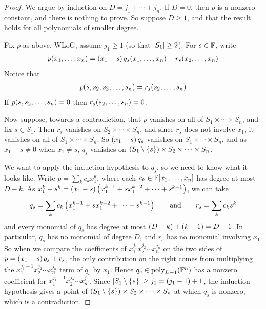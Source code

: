 \begin{proof}
    We argue by induction on $D = j_1 + \cdots + j_n$. If $D = 0$, then $p$ is a nonzero constant, and there is nothing to prove. So suppose $D \geq 1$, and that the result holds for all polynomials of smaller degree.

    Fix $p$ as above. WLoG, assume $j_1 \geq 1$ (so that $\left\lvert S_1 \right\rvert \geq 2$). For $s \in \mathbb{F}$, write
    \begin{align*}
        p\!\left( x_1, \ldots, x_n \right) = \left( x_1 - s \right) q_s\!\left( x_1, \ldots, x_n \right) + r_s\!\left( x_2, \ldots, x_n \right)
    \end{align*}
    Notice that
    \begin{align*}
        p\!\left( s, s_2, s_3, \ldots, s_n \right) = r_s\!\left( s_2, \ldots, s_n \right)
    \end{align*}
    If $p\!\left( s, s_2, \ldots, s_n \right) = 0$ then $r_s\!\left( s_2, \ldots, s_n \right) = 0$.

    Now suppose, towards a contradiction, that $p$ vanishes on all of $S_1 \times \cdots \times S_n$, and fix $s \in S_1$. Then $r_s$ vanishes on $S_2 \times \cdots \times S_n$, and since $r_s$ does not involve $x_1$, it vanishes on all of $S_1 \times \cdots \times S_n$. So $\left( x_1 - s \right) q_s$ vanishes on $S_1 \times \cdots \times S_n$, and as $x_1 - s \neq 0$ when $x_1 \neq s$, $q_s$ vanishes on $\left( S_1 \setminus \left\{ s \right\} \right) \times S_2 \times \cdots \times S_n$.

    We want to apply the induction hypothesis to $q_s$, so we need to know what it looks like. Write $p = \sum_{k} c_k x_1^k$, where each $c_k \in \mathbb{F}\!\left[ x_2, \ldots, x_n \right]$ has degree at most $D - k$. As $x_1^k - s^k = \left( x_1 - s \right)\left( x_1^{k-1} + s x_1^{k-2} + \cdots + s^{k-1} \right)$, we can take
    \begin{align*}
        q_s = \sum_{k} c_k \left( x_1^{k-1} + s x_1^{k-2} + \cdots + s^{k-1} \right) \qquad \text{and} \qquad r_s = \sum_k c_k s^k
    \end{align*}
    and every monomial of $q_s$ has degree at most $\left( D - k \right) + \left( k - 1 \right) = D - 1$. In particular, $q_s$ has no monomial of degree $D$, and $r_s$ has no monomial involving $x_1$. So when we compare the coefficients of $x_1^{j_1} x_2^{j_2} \cdots x_n^{j_n}$ on the two sides of $p = \left( x_1 - s \right) q_s + r_s$, the only contribution on the right comes from multiplying the $x_1^{j_1 - 1} x_2^{j_2} \cdots x_n^{j_n}$ term of $q_s$ by $x_1$. Hence $q_s \in \operatorname{poly}_{D - 1}\!\left( \mathbb{F}^n \right)$ has a nonzero coefficient for $x_1^{j_1 - 1} x_2^{j_2} \cdots x_n^{j_n}$. Since $\left\lvert S_1 \setminus \left\{ s \right\} \right\rvert \geq j_1 = \left( j_1 - 1 \right) + 1$, the induction hypothesis gives a point of $\left( S_1 \setminus \left\{ s \right\} \right) \times S_2 \times \cdots \times S_n$ at which $q_s$ is nonzero, which is a contradiction.
\end{proof}

